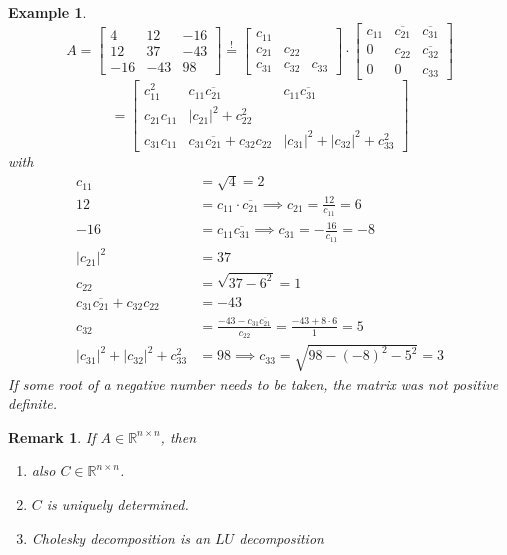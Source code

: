 \documentclass[a4paper]{article}
\newcounter{lecref}[section]
\numberwithin{lecref}{section}
\newtheorem{example}[lecref]{Example}
\newtheorem{remark}[lecref]{Remark}
\newcommand{\card}[1]{\left|#1\right|}
\begin{document}
\begin{example} %
  \[
    A = \begin{bmatrix} 4 & 12 & -16 \\ 12 & 37 & -43 \\ -16 & -43 & 98 \end{bmatrix}
    \overset!= \begin{bmatrix} c_{11} & & \\ c_{21} & c_{22} & \\ c_{31} & c_{32} & c_{33} \end{bmatrix} \cdot \begin{bmatrix} c_{11} & \overline{c_{21}} & \overline{c_{31}} \\ 0 & c_{22} & \overline{c_{32}} \\ 0 & 0 & c_{33} \end{bmatrix}
  \] \[
    = \begin{bmatrix} c_{11}^2 & c_{11} \overline{c_{21}} & c_{11} \overline{c_{31}} \\
    c_{21} c_{11} & \card{c_{21}}^2 + c_{22}^2 & \\
    c_{31} c_{11} & c_{31} \overline{c_{21}} + c_{32} c_{22} & \card{c_{31}}^2 + \card{c_{32}}^2 + c_{33}^2 \end{bmatrix}
  \]
  with
  \begin{align*}
    c_{11} &= \sqrt4 = 2 \\
    12 &= c_{11} \cdot \overline{c_{21}} \implies c_{21} = \frac{12}{c_{11}} = 6 \\
    -16 &= c_{11} \overline{c_{31}} \implies c_{31} = -\frac{16}{c_{11}} = -8 \\
    \card{c_{21}}^2 &= 37 \\
    c_{22} &= \sqrt{37 - 6^2} = 1 \\
    c_{31} \overline{c_{21}} + c_{32} c_{22} &= -43 \\
    c_{32} &= \frac{-43 - c_{31} \overline{c_21}}{c_{22}} = \frac{-43 + 8 \cdot 6}{1} = 5 \\
    \card{c_{31}}^2 + \card{c_{32}}^2 + c_{33}^2 &= 98 \implies c_{33} = \sqrt{98 - (-8)^2 - 5^2} = 3
  \end{align*}
  If some root of a negative number needs to be taken, the matrix was not positive definite.
\end{example}

\begin{remark} %
  If $A \in \mathbb R^{n \times n}$, then
  \begin{enumerate}
    \item also $C \in \mathbb R^{n \times n}$.
    \item $C$ is uniquely determined.
    \item Cholesky decomposition is an $LU$ decomposition
  \end{enumerate}
\end{remark}
\end{document}
